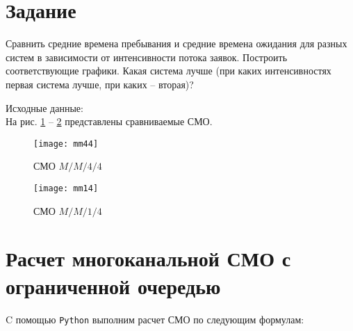 





\section{Задание}

Сравнить средние времена пребывания и средние времена ожидания для разных систем в зависимости от интенсивности потока заявок.  Построить соответствующие графики.  Какая система лучше (при каких интенсивностях первая система лучше, при каких – вторая)? 

Исходные данные:\\

На рис. \ref{pic:mm44} -- \ref{pic:mm14} представлены сравниваемые СМО.

\begin{figure}[H]
	\begin{center}
		\texttt{[image: mm44]}
		\caption{СМО $M/M/4/4$}
		\label{pic:mm44}
	\end{center}
\end{figure}

\begin{figure}[H]
	\begin{center}
		\texttt{[image: mm14]}
		\caption{СМО $M/M/1/4$}
		\label{pic:mm14}
	\end{center}
\end{figure}

\section{Расчет многоканальной СМО с ограниченной очередью}

C помощью \verb+Python+ выполним расчет СМО по следующим формулам:

